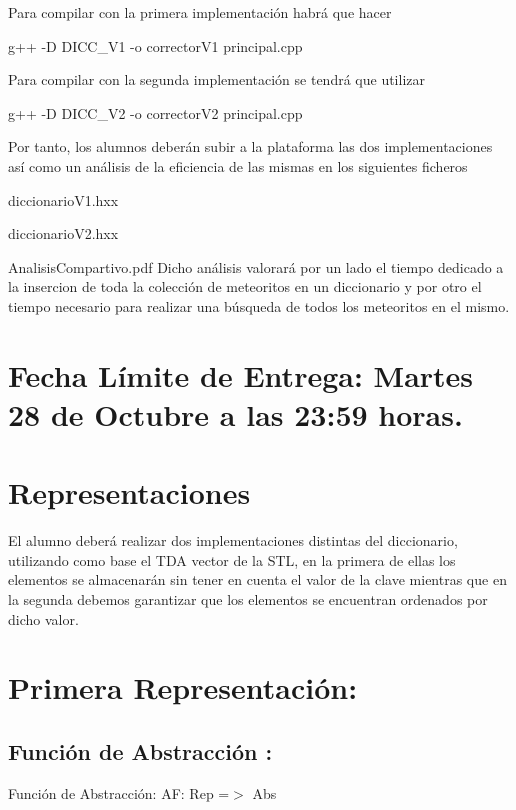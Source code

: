 Para compilar con la primera implementación habrá que hacer

\begin{DoxyItemize}
\item g++ -\/\-D D\-I\-C\-C\-\_\-\-V1 -\/o corrector\-V1 principal.\-cpp\end{DoxyItemize}
Para compilar con la segunda implementación se tendrá que utilizar

\begin{DoxyItemize}
\item g++ -\/\-D D\-I\-C\-C\-\_\-\-V2 -\/o corrector\-V2 principal.\-cpp\end{DoxyItemize}
Por tanto, los alumnos deberán subir a la plataforma las dos implementaciones así como un análisis de la eficiencia de las mismas en los siguientes ficheros

\begin{DoxyItemize}
\item diccionario\-V1.\-hxx \item diccionario\-V2.\-hxx \item Analisis\-Compartivo.\-pdf Dicho análisis valorará por un lado el tiempo dedicado a la insercion de toda la colección de meteoritos en un diccionario y por otro el tiempo necesario para realizar una búsqueda de todos los meteoritos en el mismo.\end{DoxyItemize}
\hypertarget{index_fecha}{}\section{Fecha Límite de Entrega\-: Martes 28 de Octubre a las 23\-:59 horas.}\label{index_fecha}
\hypertarget{index_rep}{}\section{Representaciones}\label{index_rep}
El alumno deberá realizar dos implementaciones distintas del diccionario, utilizando como base el T\-D\-A vector de la S\-T\-L, en la primera de ellas los elementos se almacenarán sin tener en cuenta el valor de la clave mientras que en la segunda debemos garantizar que los elementos se encuentran ordenados por dicho valor.\hypertarget{index_primera}{}\section{Primera Representación\-:}\label{index_primera}
\hypertarget{index_fact_sec1}{}\subsection{Función de Abstracción \-:}\label{index_fact_sec1}
Función de Abstracción\-: A\-F\-: Rep =$>$ Abs

